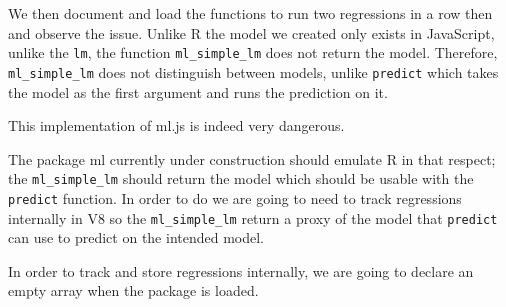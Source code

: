 \documentclass[
]{krantz}
\makeatletter
\newenvironment{Shaded}{\begin{snugshade}}{\end{snugshade}}
\newcommand{\CommentTok}[1]{\textcolor[rgb]{0.37,0.37,0.37}{\textit{#1}}}
\newcommand{\ControlFlowTok}[1]{\textcolor[rgb]{0.27,0.27,0.27}{\textbf{#1}}}
\newcommand{\DataTypeTok}[1]{\textcolor[rgb]{0.27,0.27,0.27}{#1}}
\newcommand{\DecValTok}[1]{\textcolor[rgb]{0.06,0.06,0.06}{#1}}
\newcommand{\KeywordTok}[1]{\textcolor[rgb]{0.27,0.27,0.27}{\textbf{#1}}}
\newcommand{\NormalTok}[1]{#1}
\newcommand{\OperatorTok}[1]{\textcolor[rgb]{0.43,0.43,0.43}{\textbf{#1}}}
\newcommand{\OtherTok}[1]{\textcolor[rgb]{0.37,0.37,0.37}{#1}}
\newcommand{\StringTok}[1]{\textcolor[rgb]{0.5,0.5,0.5}{#1}}
\newenvironment{kframe}{%
\medskip{}
\setlength{\fboxsep}{.8em}
 \def\at@end@of@kframe{}%
 \ifinner\ifhmode%
  \def\at@end@of@kframe{\end{minipage}}%
  \begin{minipage}{\columnwidth}%
 \fi\fi%
 \def\FrameCommand##1{\hskip\@totalleftmargin \hskip-\fboxsep
 \colorbox{shadecolor}{##1}\hskip-\fboxsep
     \hskip-\linewidth \hskip-\@totalleftmargin \hskip\columnwidth}%
 \MakeFramed {\advance\hsize-\width
   \@totalleftmargin\z@ \linewidth\hsize
   \@setminipage}}%
 {\par\unskip\endMakeFramed%
 \at@end@of@kframe}
\renewenvironment{Shaded}{\begin{kframe}}{\end{kframe}}
\makeatother
\begin{document}
We then document and load the functions to run two regressions in a row then and observe the issue. Unlike R the model we created only exists in JavaScript, unlike the \texttt{lm}, the function \texttt{ml\_simple\_lm} does not return the model. Therefore, \texttt{ml\_simple\_lm} does not distinguish between models, unlike \texttt{predict} which takes the model as the first argument and runs the prediction on it.

This implementation of ml.js is indeed very dangerous.

\begin{Shaded}
\end{Shaded}

The package ml currently under construction should emulate R in that respect; the \texttt{ml\_simple\_lm} should return the model which should be usable with the \texttt{predict} function. In order to do we are going to need to track regressions internally in V8 so the \texttt{ml\_simple\_lm} return a proxy of the model that \texttt{predict} can use to predict on the intended model.

In order to track and store regressions internally, we are going to declare an empty array when the package is loaded.

\begin{Shaded}
\end{Shaded}
\end{document}
